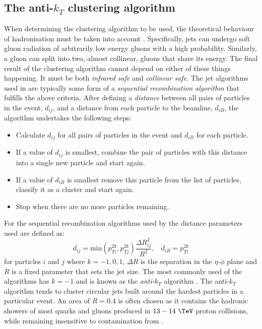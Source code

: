 \subsection{The anti-$k_T$ clustering algorithm}

When determining the clustering algorithm to be used, the theoretical
behaviour of hadronisation must be taken into account
\cite{Salam2010}. Specifically, jets can undergo soft gluon radiation
of arbitrarily low energy gluons with a high probability.
Similarly, a gluon can split into two, almost collinear, gluons that share its energy.
The final result of the clustering algorithm cannot depend
on either of these things happening. It must be both
\emph{infrared safe} and \emph{collinear safe}. The jet algorithms used in \CMS are
typically some form of a \emph{sequential recombination algorithm} that
fulfills the above criteria. After defining a \emph{distance}
between all pairs of particles in the event, $d_{ij}$, and a distance
from each particle to the beamline, $d_{iB}$, the algorithm undertakes
the following steps:
\begin{itemize}
\item{Calculate $d_{ij}$ for all pairs of particles in the event and
$d_{iB}$ for each particle.}
\item{If a value of $d_{ij}$ is smallest, combine the pair of particles
with this distance into a single new particle and start again.}
\item{If a value of $d_{iB}$ is smallest remove this particle from the
list of particles, classify it as a cluster and start again.}
\item{Stop when there are no more particles remaining.}
\end{itemize}
For the sequential recombination algorithms used by \CMS the distance
parameters used are defined as:
\begin{equation} \label{eq:antiktdij}
d_{ij} = \textrm{min}(p_{Ti}^{2k},p_{Tj}^{2k})\frac{\Delta R_{ij}^2}{R^2} ,~~~~d_{iB} = p_{Ti}^{2k}
\end{equation} 
for particles $i$ and $j$ where $k=-1,0,1$, $\Delta R$
is the separation in the $\eta$-$\phi$ plane and $R$ is a fixed
parameter that sets the jet size. The most commonly used of the \CMS
algorithms has $k=-1$ and is known as the \emph{anti-$k_T$} algorithm
\cite{1126-6708-2008-04-063}. The anti-$k_T$ algorithm tends to
cluster circular jets built around the hardest particles in a
particular event. An area of $R=0.4$ is often
chosen as it contains the hadronic showers of most quarks and gluons
produced in $13-14~\tev$ proton collisions, while remaining
insensitive to contamination from \PU.


